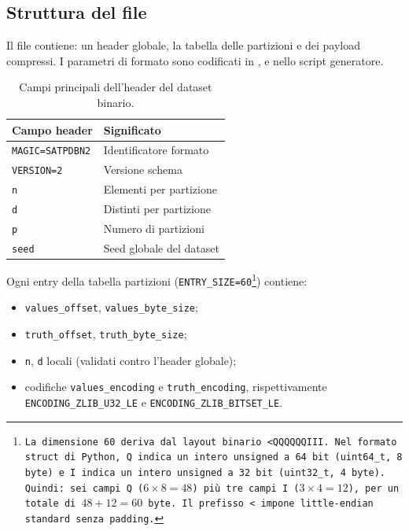 \subsection{Struttura del file}

Il file contiene: un header globale, la tabella delle partizioni e dei payload compressi.
I parametri di formato sono codificati in
,
 e nello script generatore.

\begin{table}[htbp]
    \centering
    \small
    \begin{tabular}{|l|l|}
        \hline
        Campo header & Significato \\
        \hline
        \texttt{MAGIC=SATPDBN2} & Identificatore formato \\
        \texttt{VERSION=2} & Versione schema \\
        \texttt{n} & Elementi per partizione \\
        \texttt{d} & Distinti per partizione \\
        \texttt{p} & Numero di partizioni \\
        \texttt{seed} & Seed globale del dataset \\
        \hline
    \end{tabular}
    \caption{Campi principali dell'header del dataset binario.}
    \label{tab:binary-header}
\end{table}

Ogni entry della tabella partizioni (\texttt{ENTRY\_SIZE=60\footnote{La dimensione \texttt{60} deriva dal layout binario \texttt{<QQQQQQIII}. Nel formato \texttt{struct} di Python, \texttt{Q} indica un intero unsigned a 64 bit (\texttt{uint64\_t}, 8 byte) e \texttt{I} indica un intero unsigned a 32 bit (\texttt{uint32\_t}, 4 byte). Quindi: sei campi \texttt{Q} (\(6\times 8=48\)) più tre campi \texttt{I} (\(3\times 4=12\)), per un totale di \(48+12=60\) byte. Il prefisso \texttt{<} impone little-endian standard senza padding.}}) contiene:
\begin{itemize}
    \item \texttt{values\_offset}, \texttt{values\_byte\_size};
    \item \texttt{truth\_offset}, \texttt{truth\_byte\_size};
    \item \texttt{n}, \texttt{d} locali (validati contro l'header globale);
    \item codifiche \texttt{values\_encoding} e \texttt{truth\_encoding},
    rispettivamente \texttt{ENCODING\_ZLIB\_U32\_LE} e
    \texttt{ENCODING\_ZLIB\_BITSET\_LE}.
\end{itemize}


